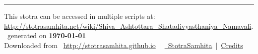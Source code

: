 \documentclass[oneside,12pt]{book}
\begin{document}
\setmainfont[Script=Devanagari,Mapping=tex-text]{Sanskrit 2003}
\fontsize {16}{19.25}\selectfont
\begin{center}

\end{center}
\vfill
\centering
\rule{0.8\textwidth}{0.6pt}

\footnotesize
{}\sffamily
This stotra can be accessed in multiple scripts at:\\
\url{http://stotrasamhita.net/wiki/Shiva_Ashtottara_Shatadivyasthaniya_Namavali}.\\[1ex]
\faFilePdfO~generated on \textbf{\today}\\[1ex]
Downloaded from \faGlobe{}~\url{http://stotrasamhita.github.io}~|~\href{https://github.com/StotraSamhita}{\faGithubSquare{}~StotraSamhita}~|~\href{https://stotrasamhita.github.io/about/}{Credits}
\end{document}
